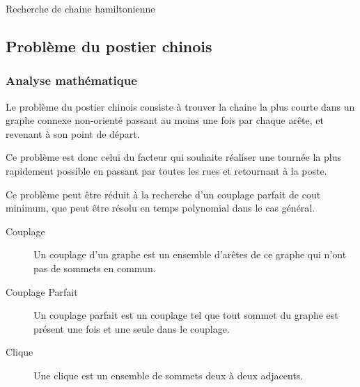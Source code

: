     \begin{algorithm}

      \caption{Recherche de chaine hamiltonienne}
      \label{alg:hamil}
    \end{algorithm}

\subsection{Problème du postier chinois}
  \subsubsection{Analyse mathématique}
    Le problème du postier chinois consiste à trouver la chaine la plus courte
    dans un graphe connexe non-orienté passant au moins une fois par chaque
    arête, et revenant à son point de départ.

    Ce problème est donc celui du facteur qui souhaite réaliser une tournée
    la plus rapidement possible en passant par toutes les rues et retournant
    à la poste.

    Ce problème peut être réduit à la recherche d'un couplage parfait de cout
    minimum, que peut être résolu en temps polynomial dans le cas général.

    \begin{description}
      \item[Couplage] Un couplage d'un graphe est un ensemble d'arêtes de ce
        graphe qui n'ont pas de sommets en commun.
      \item[Couplage Parfait] Un couplage parfait est un couplage tel que tout
        sommet du graphe est présent une fois et une seule dans le couplage.
      \item[Clique] Une clique est un ensemble de sommets deux à deux
        adjacents.
    \end{description}

